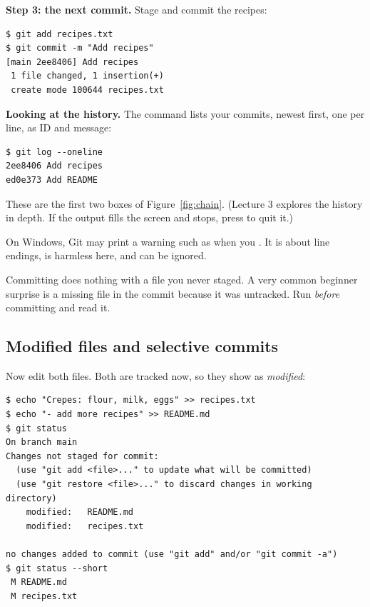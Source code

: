 \textbf{Step 3: the next commit.} Stage and commit the recipes:

\begin{lstlisting}
$ git add recipes.txt
$ git commit -m "Add recipes"
[main 2ee8406] Add recipes
 1 file changed, 1 insertion(+)
 create mode 100644 recipes.txt
\end{lstlisting}

\textbf{Looking at the history.} The command  lists your commits, newest first, one per line, as ID and message:

\begin{lstlisting}
$ git log --oneline
2ee8406 Add recipes
ed0e373 Add README
\end{lstlisting}

These are the first two boxes of Figure~\ref{fig:chain}. (Lecture 3 explores the history in depth. If the output fills the screen and stops, press  to quit it.)

\begin{quickfact}
On Windows, Git may print a warning such as  when you . It is about line endings, is harmless here, and can be ignored.
\end{quickfact}

\begin{pitfall}
Committing does nothing with a file you never staged. A very common beginner surprise is a missing file in the commit because it was untracked. Run  \emph{before} committing and read it.
\end{pitfall}

\subsection{Modified files and selective commits}

Now edit both files. Both are tracked now, so they show as \emph{modified}:

\begin{lstlisting}
$ echo "Crepes: flour, milk, eggs" >> recipes.txt
$ echo "- add more recipes" >> README.md
$ git status
On branch main
Changes not staged for commit:
  (use "git add <file>..." to update what will be committed)
  (use "git restore <file>..." to discard changes in working directory)
	modified:   README.md
	modified:   recipes.txt

no changes added to commit (use "git add" and/or "git commit -a")
$ git status --short
 M README.md
 M recipes.txt
\end{lstlisting}


